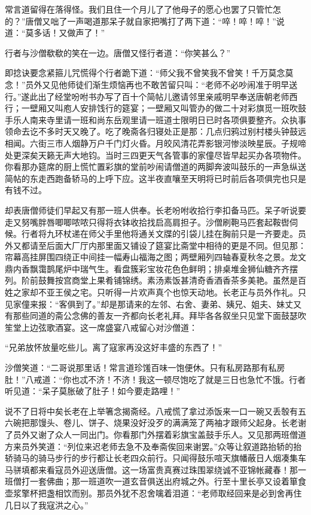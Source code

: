 \documentclass[12pt,UTF8]{ctexbook}
\begin{document}
{	常言道留得在落得怪。我们且住一个月儿了了他母子的愿心也罢了只管忙怎的？”唐僧又咄了一声喝道那呆子就自家把嘴打了两下道：“啐！啐！啐！”说道：“莫多话！又做声了！”
	
	行者与沙僧欷欷的笑在一边。唐僧又怪行者道：“你笑甚么？”
	
	即捻诀要念紧箍儿咒慌得个行者跪下道：“师父我不曾笑我不曾笑！千万莫念莫念！”员外又见他师徒们渐生烦恼再也不敢苦留只叫：“老师不必吵闹准于明早送行。”遂此出了经堂吩咐书办写了百十个简帖儿邀请邻里亲戚明早奉送唐朝老师西行；一壁厢又叫庖人安排饯行的筵宴；一壁厢又叫管办的做二十对彩旗觅一班吹鼓手乐人南来寺里请一班和尚东岳观里请一班道士限明日已时各项俱要整齐。众执事领命去讫不多时天又晚了。吃了晚斋各归寝处正是那：几点归鸦过别村楼头钟鼓远相闻。六街三市人烟静万户千门灯火昏。月皎风清花弄影银河惨淡映星辰。子规啼处更深矣天籁无声大地钧。当时三四更天气各管事的家僮尽皆早起买办各项物件。你看那办筵席的厨上慌忙置彩旗的堂前吵闹请僧道的两脚奔波叫鼓乐的一声急纵送简帖的东走西跑备轿马的上呼下应。这半夜直嚷至天明将已时前后各项俱完也只是有钱不过。
	
	却表唐僧师徒们早起又有那一班人供奉。长老吩咐收拾行李扣备马匹。呆子听说要走又努嘴胖唇唧唧哝哝只得将衣钵收拾找启高肩担子。沙僧刷鞄马匹套起鞍辔伺候。行者将九环杖递在师父手里他将通关文牒的引袋儿挂在胸前只是一齐要走。员外又都请至后面大厂厅内那里面又铺设了筵宴比斋堂中相待的更是不同。但见那：帘幕高挂屏围四绕正中间挂一幅寿山福海之图；两壁厢列四轴春夏秋冬之景。龙文鼎内香飘霭鹊尾炉中瑞气生。看盘簇彩宝妆花色色鲜明；排桌堆金狮仙糖齐齐摆列。阶前鼓舞按宫商堂上果肴铺锦绣。素汤素饭甚清奇香酒香茶多美艳。虽然是百姓之家却不亚王侯之宅。只听得一片欢声真个也惊天动地。长老正与员外作礼。只见家僮来报：“客俱到了。”却是那请来的左邻、右舍、妻弟、姨兄、姐夫、妹丈又有那些同道的斋公念佛的善友一齐都向长老礼拜。拜毕各各叙坐只见堂下面鼓瑟吹笙堂上边弦歌酒宴。这一席盛宴八戒留心对沙僧道：
	
	“兄弟放怀放量吃些儿。离了寇家再没这好丰盛的东西了！”
	
	沙僧笑道：“二哥说那里话！常言道珍馐百味一饱便休。只有私房路那有私房肚！”八戒道：“你也忒不济！不济！我这一顿尽饱吃了就是三日也急忙不饿。行者听见道：“呆子莫胀破了肚子！如今要走路哩！”
	
	说不了日将中矣长老在上举箸念揭斋经。八戒慌了拿过添饭来一口一碗又丢彀有五六碗把那馒头、卷儿、饼子、烧果没好没歹的满满笼了两袖才跟师父起身。长老谢了员外又谢了众人一同出门。你看那门外摆着彩旗宝盖鼓手乐人。又见那两班僧道方来员外笑道：“列位来迟老师去急不及奉斋俟回来谢罢。”众等让叙道路抬轿的抬轿骑马的骑马步行的步行都让长老四众前行。只闻得鼓乐喧天旗幡蔽日人烟凑集车马骈填都来看寇员外迎送唐僧。这一场富贵真赛过珠围翠绕诚不亚锦帐藏春！那一班僧打一套佛曲；那一班道吹一道玄音俱送出府城之外。行至十里长亭又设着箪食壶浆擎杯把盏相饮而别。那员外犹不忍舍噙着泪道：“老师取经回来是必到舍再住几日以了我寇洪之心。”
	
}
\end{document}
